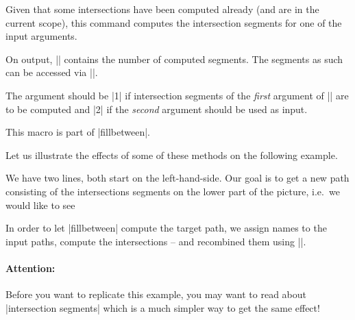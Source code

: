 \begin{command}{\pgfcomputeintersectionsegments{}}
 Given that some intersections have been computed already (and are in
 the current scope), this command computes the intersection segments
 for one of the input arguments.

 On output, |\pgfretval| contains the number of computed segments. The
 segments as such can be accessed via |\pgfgetintersectionsegmentpath|.

	The argument  should be |1| if intersection segments of the \emph{first} argument of
 |\pgfintersectionofpaths| are to be computed and |2| if the \emph{second}
 argument should be used as input.

	This macro is part of |fillbetween|.

	Let us illustrate the effects of some of these methods on the following example.
\begin{codeexample}[]
\end{codeexample}
	We have two lines, both start on the left-hand-side. Our goal is to get a new path consisting of the intersections segments on the lower part of the picture, i.e.\ we would like to see
\begin{codeexample}[]
\end{codeexample}
	
	In order to let |fillbetween| compute the target path, we assign names to the input paths, compute the intersections -- and recombined them using |\pgfcomputeintersectionsegments|.

	\paragraph{Attention:} Before you want to replicate this example, you may want to read about |intersection segments| which is a much simpler way to get the same effect!

\begin{codeexample}[vbox]
\end{codeexample}
\end{command}
